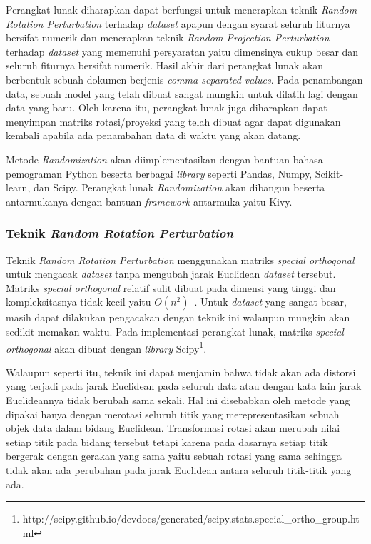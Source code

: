 Perangkat lunak diharapkan dapat berfungsi untuk menerapkan teknik \textit{Random Rotation Perturbation} terhadap \textit{dataset} apapun dengan syarat seluruh fiturnya bersifat numerik dan menerapkan teknik \textit{Random Projection Perturbation} terhadap \textit{dataset} yang memenuhi persyaratan yaitu dimensinya cukup besar dan seluruh fiturnya bersifat numerik. Hasil akhir dari perangkat lunak akan berbentuk sebuah dokumen berjenis \textit{comma-separated values}. Pada penambangan data, sebuah model yang telah dibuat sangat mungkin untuk dilatih lagi dengan data yang baru. Oleh karena itu, perangkat lunak juga diharapkan dapat menyimpan matriks rotasi/proyeksi yang telah dibuat agar dapat digunakan kembali apabila ada penambahan data di waktu yang akan datang.

Metode \textit{Randomization} akan diimplementasikan dengan bantuan bahasa pemograman Python beserta berbagai \textit{library} seperti Pandas, Numpy, Scikit-learn, dan Scipy. Perangkat lunak \textit{Randomization} akan dibangun beserta antarmukanya dengan bantuan \textit{framework} antarmuka yaitu Kivy.

\subsubsection{Teknik \textit{Random Rotation Perturbation}}
\label{subsubsec:analisis-rrp}

Teknik \textit{Random Rotation Perturbation} menggunakan matriks \textit{special orthogonal} untuk mengacak \textit{dataset} tanpa mengubah jarak Euclidean \textit{dataset} tersebut. Matriks \textit{special orthogonal} relatif sulit dibuat pada dimensi yang tinggi dan kompleksitasnya tidak kecil yaitu \(O(n^2)\)~\cite{stewart:80:orthogonal}. Untuk \textit{dataset} yang sangat besar, masih dapat dilakukan pengacakan dengan teknik ini walaupun mungkin akan sedikit memakan waktu. Pada implementasi perangkat lunak, matriks \textit{special orthogonal} akan dibuat dengan \textit{library} Scipy\footnote{http://scipy.github.io/devdocs/generated/scipy.stats.special\_ortho\_group.html}.

Walaupun seperti itu, teknik ini dapat menjamin bahwa tidak akan ada distorsi yang terjadi pada jarak Euclidean pada seluruh data atau dengan kata lain jarak Euclideannya tidak berubah sama sekali. Hal ini disebabkan oleh metode yang dipakai hanya dengan merotasi seluruh titik yang merepresentasikan sebuah objek data dalam bidang Euclidean. Transformasi rotasi akan merubah nilai setiap titik pada bidang tersebut tetapi karena pada dasarnya setiap titik bergerak dengan gerakan yang sama yaitu sebuah rotasi yang sama sehingga tidak akan ada perubahan pada jarak Euclidean antara seluruh titik-titik yang ada.

